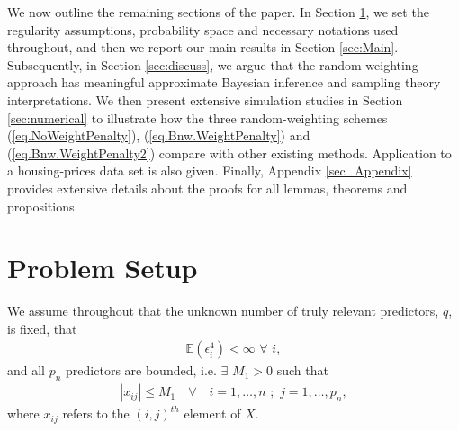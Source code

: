 \documentclass[ejs,authoryear,linksfromyear]{imsart}
\numberwithin{equation}{section}
\theoremstyle{plain}
\begin{document}

We now outline the remaining sections of the paper. In Section \ref{sec:problem_setup}, we set the regularity assumptions, probability space and necessary notations used throughout, and then we report our main results in Section \ref{sec:Main}. Subsequently, in Section \ref{sec:discuss}, we argue that the random-weighting approach has meaningful approximate Bayesian inference and sampling theory interpretations. We then present extensive simulation studies in Section \ref{sec:numerical} to illustrate how the three random-weighting schemes (\ref{eq.NoWeightPenalty}), (\ref{eq.Bnw.WeightPenalty}) and (\ref{eq.Bnw.WeightPenalty2}) compare with other existing methods. Application to a housing-prices data set is also given. Finally, Appendix \ref{sec_Appendix} provides extensive details about the proofs for all lemmas, theorems and propositions.    

\section{Problem Setup} \label{sec:problem_setup}


We assume throughout that the unknown number  of truly relevant predictors, $q$, is fixed, that  
\begin{align} \label{assume_4thmoment}
\mathbb{E} (\epsilon_i^4) < \infty \,\, \forall \,\, i,
\end{align}
\noindent and all $p_n$ predictors are bounded, i.e. $\exists$ $M_1 > 0$ such that 
\begin{align} \label{assume_boundedX}
|x_{ij}| \leq M_1 \quad \forall \quad i = 1, \ldots, n\,\, ; \,\, j = 1, \ldots, p_n,  
\end{align}
\noindent where $x_{ij}$ refers to the $(i,j)^{th}$ element of $X$. 
\end{document}
